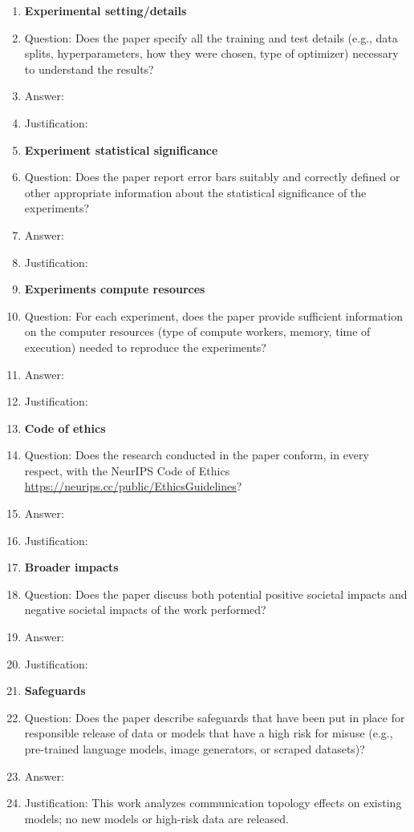 \begin{enumerate}
\item {\bf Experimental setting/details}
    \item[] Question: Does the paper specify all the training and test details (e.g., data splits, hyperparameters, how they were chosen, type of optimizer) necessary to understand the results?
    \item[] Answer: \answerTODO{}
    \item[] Justification: \justificationTODO{}

\item {\bf Experiment statistical significance}
    \item[] Question: Does the paper report error bars suitably and correctly defined or other appropriate information about the statistical significance of the experiments?
    \item[] Answer: \answerTODO{}
    \item[] Justification: \justificationTODO{}

\item {\bf Experiments compute resources}
    \item[] Question: For each experiment, does the paper provide sufficient information on the computer resources (type of compute workers, memory, time of execution) needed to reproduce the experiments?
    \item[] Answer: \answerTODO{}
    \item[] Justification: \justificationTODO{}

\item {\bf Code of ethics}
    \item[] Question: Does the research conducted in the paper conform, in every respect, with the NeurIPS Code of Ethics \url{https://neurips.cc/public/EthicsGuidelines}?
    \item[] Answer: \answerTODO{}
    \item[] Justification: \justificationTODO{}

\item {\bf Broader impacts}
    \item[] Question: Does the paper discuss both potential positive societal impacts and negative societal impacts of the work performed?
    \item[] Answer: \answerTODO{}
    \item[] Justification: \justificationTODO{}

\item {\bf Safeguards}
    \item[] Question: Does the paper describe safeguards that have been put in place for responsible release of data or models that have a high risk for misuse (e.g., pre-trained language models, image generators, or scraped datasets)?
    \item[] Answer: \answerNA{}
    \item[] Justification: This work analyzes communication topology effects on existing models; no new models or high-risk data are released.


\end{enumerate}
